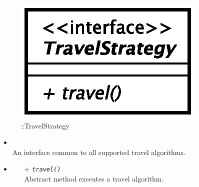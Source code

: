 \begin{figure}[h]
\centering
\includegraphics[scale=0.6,keepaspectratio]{images/solution/app/backend/travel_strategy.eps}
\caption{\pActive::TravelStrategy}
\label{fig:sd-app-travel-strategy}
\end{figure}
\FloatBarrier
\begin{itemize}
  \item \textbf{\descr} \\
    An interface common to all supported travel algorithms.
  \item \textbf{\ops}
  \begin{itemize}
    \item[+] \texttt{\textit{travel()}} \\
    Abstract method executes a travel algorithm.
  \end{itemize}
\end{itemize}
